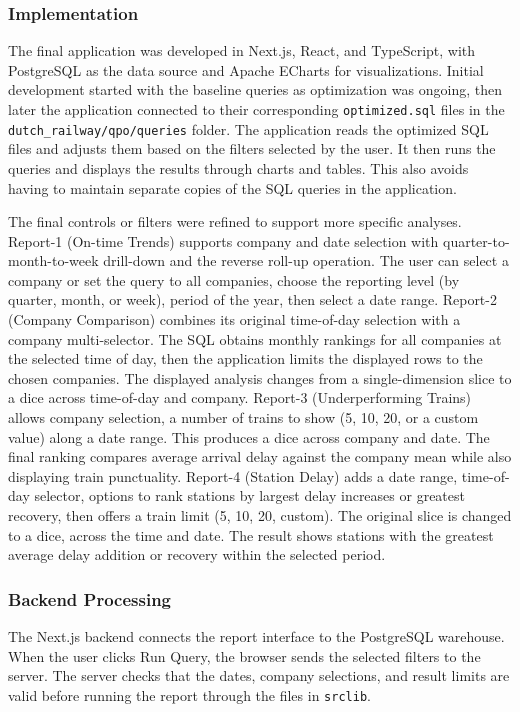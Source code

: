 \subsubsection{Implementation}

The final application was developed in Next.js, React, and TypeScript, with PostgreSQL as the data source and Apache ECharts for visualizations. Initial development started with the baseline queries as optimization was ongoing, then later the application connected to their corresponding \texttt{optimized.sql} files in the \texttt{dutch\_railway/qpo/queries} folder. The application reads the optimized SQL files and adjusts them based on the filters selected by the user. It then runs the queries and displays the results through charts and tables. This also avoids having to maintain separate copies of the SQL queries in the application.

The final controls or filters were refined to support more specific analyses. Report-1 (On-time Trends) supports company and date selection with quarter-to-month-to-week drill-down and the reverse roll-up operation. The user can select a company or set the query to all companies, choose the reporting level (by quarter, month, or week), period of the year, then select a date range. Report-2 (Company Comparison) combines its original time-of-day selection with a company multi-selector. The SQL obtains monthly rankings for all companies at the selected time of day, then the application limits the displayed rows to the chosen companies. The displayed analysis changes from a single-dimension slice to a dice across time-of-day and company. Report-3 (Underperforming Trains) allows company selection, a number of trains to show (5, 10, 20, or a custom value) along a date range. This produces a dice across company and date. The final ranking compares average arrival delay against the company mean while also displaying train punctuality. Report-4 (Station Delay) adds a date range, time-of-day selector, options to rank stations by largest delay increases or greatest recovery, then offers a train limit (5, 10, 20, custom). The original slice is changed to a dice, across the time and date. The result shows stations with the greatest average delay addition or recovery within the selected period.

\subsubsection{Backend Processing}
The Next.js backend connects the report interface to the PostgreSQL warehouse. When the user clicks Run Query, the browser sends the selected filters to the server. The server checks that the dates, company selections, and result limits are valid before running the report through the files in \texttt{src\/lib}.

